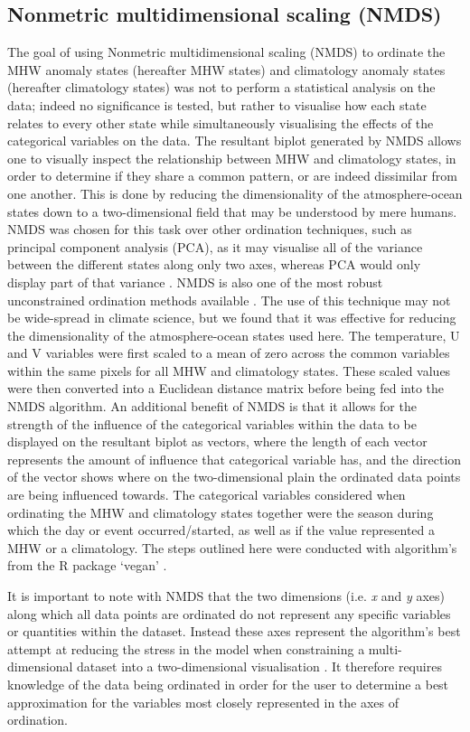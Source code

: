 \documentclass[utf8]{frontiersSCNS}
\begin{document}
\subsection{Nonmetric multidimensional scaling (NMDS)}
The goal of using Nonmetric multidimensional scaling (NMDS) to ordinate the MHW anomaly states (hereafter MHW states) and climatology anomaly states (hereafter climatology states) was not to perform a statistical analysis on the data; indeed no significance is tested, but rather to visualise how each state relates to every other state while simultaneously visualising the effects of the categorical variables on the data. The resultant biplot generated by NMDS allows one to visually inspect the relationship between MHW and climatology states, in order to determine if they share a common pattern, or are indeed dissimilar from one another. This is done by reducing the dimensionality of the atmosphere-ocean states down to a two-dimensional field that may be understood by mere humans. NMDS was chosen for this task over other ordination techniques, such as principal component analysis (PCA), as it may visualise all of the variance between the different states along only two axes, whereas PCA would only display part of that variance \citep{Paliy2016}. NMDS is also one of the most robust unconstrained ordination methods available \citep{Minchin1987}. The use of this technique may not be wide-spread in climate science, but we found that it was effective for reducing the dimensionality of the atmosphere-ocean states used here. The temperature, U and V variables were first scaled to a mean of zero across the common variables within the same pixels for all MHW and climatology states. These scaled values were then converted into a Euclidean distance matrix before being fed into the NMDS algorithm. An additional benefit of NMDS is that it allows for the strength of the influence of the categorical variables within the data to be displayed on the resultant biplot as vectors, where the length of each vector represents the amount of influence that categorical variable has, and the direction of the vector shows where on the two-dimensional plain the ordinated data points are being influenced towards. The categorical variables considered when ordinating the MHW and climatology states together were the season during which the day or event occurred/started, as well as if the value represented a MHW or a climatology. The steps outlined here were conducted with algorithm's from the R package `vegan' \citep{Oksanen2017}.

It is important to note with NMDS that the two dimensions (i.e. \emph{x} and \emph{y} axes) along which all data points are ordinated do not represent any specific variables or quantities within the dataset. Instead these axes represent the algorithm's best attempt at reducing the stress in the model when constraining a multi-dimensional dataset into a two-dimensional visualisation \citep{Kruskal1964}. It therefore requires knowledge of the data being ordinated in order for the user to determine a best approximation for the variables most closely represented in the axes of ordination.
\end{document}
